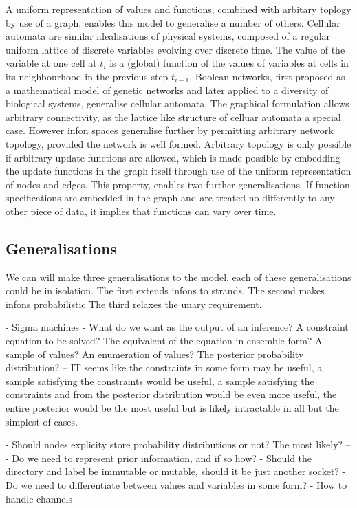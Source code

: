A uniform representation of values and functions, combined with arbitary toplogy by use of a graph, enables this model to generalise a number of others.
Cellular automata are similar idealisations of physical systems, composed of a regular uniform lattice of discrete variables evolving over discrete time. 
The value of the variable at one cell at $t_i$ is a (global) function of the values of variables at cells in its neighbourhood in the previous step $t_{i-1}$.
Boolean networks, first proposed as a mathematical model of genetic networks and later applied to a diversity of biological systems, generalise cellular automata.
The graphical formulation allows arbitrary connectivity, as the lattice like structure of celluar automata a special case.
However infon spaces generalise further by permitting arbitrary network topology, provided the network is well formed.
Arbitrary topology is only possible if arbitrary update functions are allowed, which is made possible by embedding the update functions in the graph itself through use of the uniform representation of nodes and edges.
This property, enables two further generalisations.
If function specifications are embedded in the graph and are treated no differently to any other piece of data, it implies that functions can vary over time.

\subsection{Generalisations}

We can will make three generalisations to the model, each of these generalisations could be in isolation.
The first extends infons to strands.
The second makes infons probabilistic
The third relaxes the unary requirement.



- Sigma machines 
- What do we want as the output of an inference? A constraint equation to be solved? The equivalent of the equation in ensemble form? A sample of values? An enumeration of values? The posterior probability distribution?
-- IT seems like the constraints in some form may be useful, a sample satisfying the constraints would be useful, a sample satisfying the constraints and from the posterior distribution would be even more useful, the entire posterior would be the most useful but is likely intractable in all but the simplest of cases.

- Should nodes explicity store probability distributions or not?  The most likely?
--  
- Do we need to represent prior information, and if so how?
- Should the directory and label be immutable or mutable, should it be just another socket?
- Do we need to differentiate between values and variables in some form?
- How to handle channels


